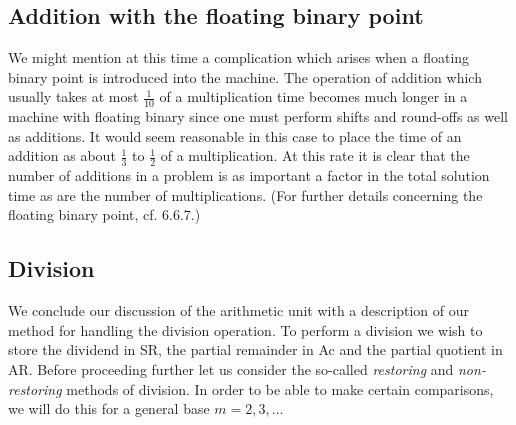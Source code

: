 \documentclass[12pt]{amsart}
\begin{document}
\subsection{Addition with the floating binary point}
We might mention at this time a complication which arises when a floating binary point is introduced into the machine. The operation of addition which usually takes at most $\frac{1}{10}$ of a multiplication time becomes much longer in a machine with floating binary since one must perform shifts and round-offs as well as additions. It would seem reasonable in this case to place the time of an addition as about $\frac{1}{3}$ to $\frac{1}{2}$ of a multiplication. At this rate it is clear that the number of additions in a problem is as important a factor in the total solution time as are the number of multiplications. (For further details concerning the floating binary point, cf. 6.6.7.)

\subsection{Division}
We conclude our discussion of the arithmetic unit with a description of our method for handling the division operation. To perform a division we wish to store the dividend in SR, the partial remainder in Ac and the partial quotient in AR. Before proceeding further let us consider the so-called \emph{restoring} and \emph{non-restoring} methods of division. In order to be able to make certain comparisons, we will do this for a general base $m = 2, 3, \dots$
\end{document}
